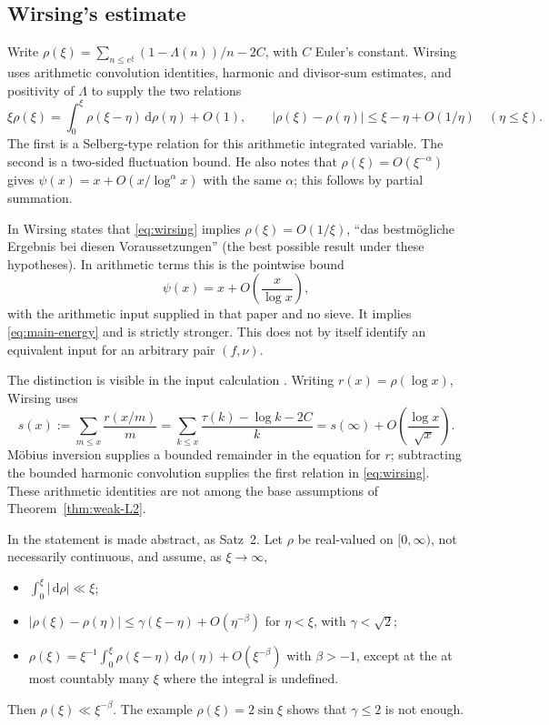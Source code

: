 \documentclass[11pt,letterpaper]{article}
\numberwithin{equation}{section}
\theoremstyle{definition}
\theoremstyle{remark}
\newcommand{\dd}{\,\mathrm d}
\begin{document}
\subsection{Wirsing's estimate}\label{sec:lit-wirsing}

Write $\rho(\xi)=\sum_{n\le e^\xi}(1-\Lambda(n))/n-2C$, with $C$ Euler's
constant. Wirsing \cite[Sections~2 and~4]{wirsing1} uses arithmetic
convolution identities, harmonic and divisor-sum estimates, and positivity
of $\Lambda$ to supply the two relations
\begin{equation}\label{eq:wirsing}
 \xi\rho(\xi)=\int_0^\xi\rho(\xi-\eta)\dd\rho(\eta)+O(1),\qquad
 |\rho(\xi)-\rho(\eta)|\le\xi-\eta+O(1/\eta)\quad(\eta\le\xi).
\end{equation}
The first is a Selberg-type relation for this arithmetic integrated
variable. The second is a two-sided fluctuation bound. He also notes that
$\rho(\xi)=O(\xi^{-\alpha})$ gives $\psi(x)=x+O(x/\log^\alpha x)$ with the
same $\alpha$; this follows by partial summation.

In \cite[Section~3]{wirsing1} Wirsing states that \eqref{eq:wirsing} implies
$\rho(\xi)=O(1/\xi)$, ``das bestm\"ogliche Ergebnis bei diesen
Voraussetzungen'' (the best possible result under these hypotheses).
In arithmetic terms this is the pointwise bound
\[
 \psi(x)=x+O\!\left(\frac{x}{\log x}\right),
\]
with the arithmetic input supplied in that paper and no sieve. It implies
\eqref{eq:main-energy} and is strictly stronger. This does not by itself
identify an equivalent input for an arbitrary pair $(f,\nu)$.

The distinction is visible in the input calculation
\cite[Section~4, pp.~207--208]{wirsing1}. Writing $r(x)=\rho(\log x)$,
Wirsing uses
\[
 s(x):=\sum_{m\le x}\frac{r(x/m)}m
 =\sum_{k\le x}\frac{\tau(k)-\log k-2C}{k}
 =s(\infty)+O\!\left(\frac{\log x}{\sqrt x}\right).
\]
M\"obius inversion supplies a bounded remainder in the equation for $r$;
subtracting the bounded harmonic convolution supplies the first relation
in \eqref{eq:wirsing}. These arithmetic identities are not among the base
assumptions of Theorem~\ref{thm:weak-L2}.

In \cite[Section~5]{wirsing2} the statement is made abstract, as Satz~2.
Let $\rho$ be real-valued on $[0,\infty)$, not necessarily continuous, and
assume, as $\xi\to\infty$,
\begin{itemize}
 \item $\int_0^\xi|\dd\rho|\ll\xi$;
 \item $|\rho(\xi)-\rho(\eta)|\le\gamma(\xi-\eta)+O(\eta^{-\beta})$ for
       $\eta<\xi$, with $\gamma<\sqrt2$;
 \item $\rho(\xi)=\xi^{-1}\int_0^\xi\rho(\xi-\eta)\dd\rho(\eta)
       +O(\xi^{-\beta})$ with $\beta>-1$, except at the at most countably
       many $\xi$ where the integral is undefined.
\end{itemize}
Then $\rho(\xi)\ll\xi^{-\beta}$. The example $\rho(\xi)=2\sin\xi$ shows that
$\gamma\le2$ is not enough.
\end{document}
